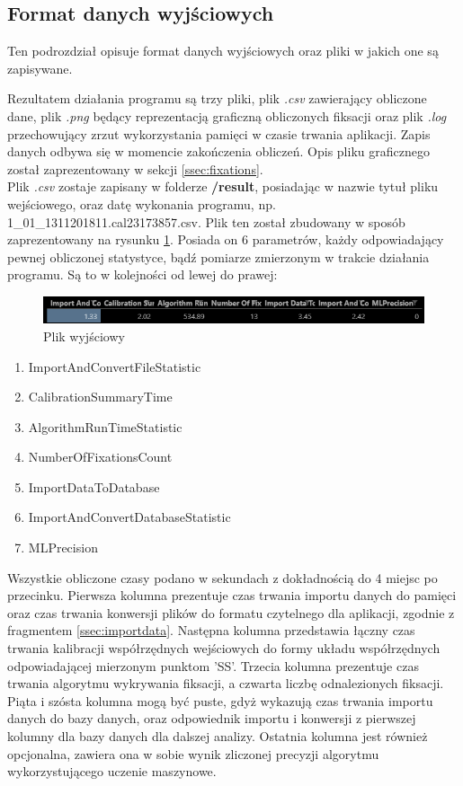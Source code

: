 \subsection{Format danych wyjściowych}
\label{ssec:exitdata}
Ten podrozdział opisuje format danych wyjściowych oraz pliki w jakich one są zapisywane.\par
Rezultatem działania programu są trzy pliki, plik \emph{.csv} zawierający obliczone dane, plik \emph{.png} będący reprezentacją graficzną obliczonych fiksacji oraz plik \emph{.log} przechowujący zrzut wykorzystania pamięci w czasie trwania aplikacji. Zapis danych odbywa się w momencie zakończenia obliczeń. Opis pliku graficznego został zaprezentowany w sekcji \ref{ssec:fixations}.\\
Plik \emph{.csv} zostaje zapisany w folderze \textbf{/result}, posiadając w nazwie tytuł pliku wejściowego, oraz datę wykonania programu, np. 1\_01\_1311201811.cal23\-173857.csv.
Plik ten został zbudowany w sposób zaprezentowany na rysunku \ref{fig:exportfile}. Posiada on 6 parametrów, każdy odpowiadający pewnej obliczonej statystyce, bądź pomiarze zmierzonym w trakcie działania programu. Są to w kolejności od lewej do prawej:
\begin{figure}[H]
        \centering
        \captionsetup{justification=centering,margin=2cm}
        \includegraphics[width=0.8\linewidth]{resources/exportfile.png}
        \caption{Plik wyjściowy}
        \label{fig:exportfile}
\end{figure}
\begin{enumerate}[itemsep=1pt] 
        \item ImportAndConvertFileStatistic
        \item CalibrationSummaryTime
        \item AlgorithmRunTimeStatistic
        \item NumberOfFixationsCount
        \item ImportDataToDatabase
        \item ImportAndConvertDatabaseStatistic
        \item MLPrecision
\end{enumerate}
Wszystkie obliczone czasy podano w sekundach z dokładnością do 4 miejsc po przecinku. Pierwsza kolumna prezentuje czas trwania importu danych do pamięci oraz czas trwania konwersji plików do formatu czytelnego dla aplikacji, zgodnie z fragmentem \ref{ssec:importdata}. Następna kolumna przedstawia łączny czas trwania kalibracji współrzędnych wejściowych do formy układu współrzędnych odpowiadającej mierzonym punktom 'SS'. Trzecia kolumna prezentuje czas trwania algorytmu wykrywania fiksacji, a czwarta liczbę odnalezionych fiksacji. Piąta i szósta kolumna mogą być puste, gdyż wykazują czas trwania importu danych do bazy danych, oraz odpowiednik importu i konwersji z pierwszej kolumny dla bazy danych dla dalszej analizy. Ostatnia kolumna jest również opcjonalna, zawiera ona w sobie wynik zliczonej precyzji algorytmu wykorzystującego uczenie maszynowe.\\
